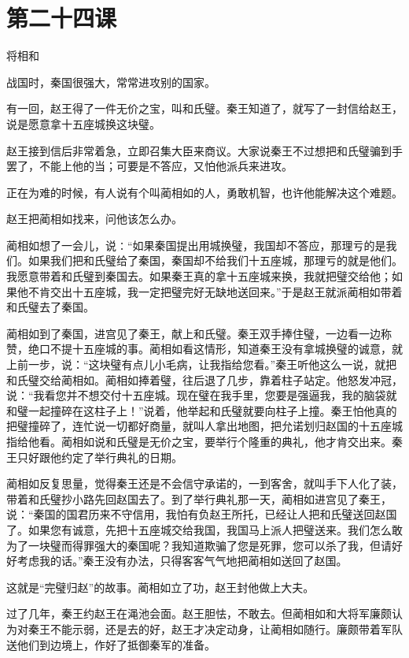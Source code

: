 \documentclass[12pt,UTF8]{ctexbook}
\begin{document}
\section{第二十四课}

将相和

战国时，秦国很强大，常常进攻别的国家。

有一回，赵王得了一件无价之宝，叫和氏璧。秦王知道了，就写了一封信给赵王，说是愿意拿十五座城换这块璧。

赵王接到信后非常着急，立即召集大臣来商议。大家说秦王不过想把和氏璧骗到手罢了，不能上他的当；可要是不答应，又怕他派兵来进攻。

正在为难的时候，有人说有个叫蔺相如的人，勇敢机智，也许他能解决这个难题。

赵王把蔺相如找来，问他该怎么办。

蔺相如想了一会儿，说∶“如果秦国提出用城换璧，我国却不答应，那理亏的是我们。如果我们把和氏璧给了秦国，秦国却不给我们十五座城，那理亏的就是他们。我愿意带着和氏璧到秦国去。如果秦王真的拿十五座城来换，我就把璧交给他；如果他不肯交出十五座城，我一定把璧完好无缺地送回来。”于是赵王就派蔺相如带着和氏璧去了秦国。

蔺相如到了秦国，进宫见了秦王，献上和氏璧。秦王双手捧住璧，一边看一边称赞，绝口不提十五座城的事。蔺相如看这情形，知道秦王没有拿城换璧的诚意，就上前一步，说：“这块璧有点儿小毛病，让我指给您看。”秦王听他这么一说，就把和氏璧交给蔺相如。蔺相如捧着璧，往后退了几步，靠着柱子站定。他怒发冲冠，说：“我看您并不想交付十五座城。现在璧在我手里，您要是强逼我，我的脑袋就和璧一起撞碎在这柱子上！”说着，他举起和氏璧就要向柱子上撞。秦王怕他真的把璧撞碎了，连忙说一切都好商量，就叫人拿出地图，把允诺划归赵国的十五座城指给他看。蔺相如说和氏璧是无价之宝，要举行个隆重的典礼，他才肯交出来。秦王只好跟他约定了举行典礼的日期。

蔺相如反复思量，觉得秦王还是不会信守承诺的，一到客舍，就叫手下人化了装，带着和氏璧抄小路先回赵国去了。到了举行典礼那一天，蔺相如进宫见了秦王，说：“秦国的国君历来不守信用，我怕有负赵王所托，已经让人把和氏璧送回赵国了。如果您有诚意，先把十五座城交给我国，我国马上派人把璧送来。我们怎么敢为了一块璧而得罪强大的秦国呢？我知道欺骗了您是死罪，您可以杀了我，但请好好考虑我的话。”秦王没有办法，只得客客气气地把蔺相如送回了赵国。

这就是“完璧归赵”的故事。蔺相如立了功，赵王封他做上大夫。

过了几年，秦王约赵王在渑池会面。赵王胆怯，不敢去。但蔺相如和大将军廉颇认为对秦王不能示弱，还是去的好，赵王才决定动身，让蔺相如随行。廉颇带着军队送他们到边境上，作好了抵御秦军的准备。
\end{document}
